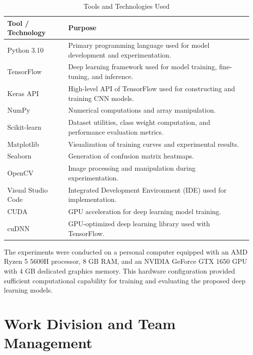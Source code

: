 \begin{table}[H]
\centering

\label{tab:tools_technologies}
\begin{tabular}{|p{4cm}|p{10cm}|}
\hline
\textbf{Tool / Technology} & \textbf{Purpose} \\ \hline
Python 3.10 & Primary programming language used for model development and experimentation. \\ \hline
TensorFlow & Deep learning framework used for model training, fine-tuning, and inference. \\ \hline
Keras API & High-level API of TensorFlow used for constructing and training CNN models. \\ \hline
NumPy & Numerical computations and array manipulation. \\ \hline
Scikit-learn & Dataset utilities, class weight computation, and performance evaluation metrics. \\ \hline
Matplotlib & Visualization of training curves and experimental results. \\ \hline
Seaborn & Generation of confusion matrix heatmaps. \\ \hline
OpenCV & Image processing and manipulation during experimentation. \\ \hline
Visual Studio Code & Integrated Development Environment (IDE) used for implementation. \\ \hline
CUDA & GPU acceleration for deep learning model training. \\ \hline
cuDNN & GPU-optimized deep learning library used with TensorFlow. \\ \hline
\end{tabular}
\caption{Tools and Technologies Used}
\end{table}

The experiments were conducted on a personal computer equipped with an AMD Ryzen 5 5600H processor, 8 GB RAM, and an NVIDIA GeForce GTX 1650 GPU with 4 GB dedicated graphics memory. This hardware configuration provided sufficient computational capability for training and evaluating the proposed deep learning models.


\section{Work Division and Team Management}

